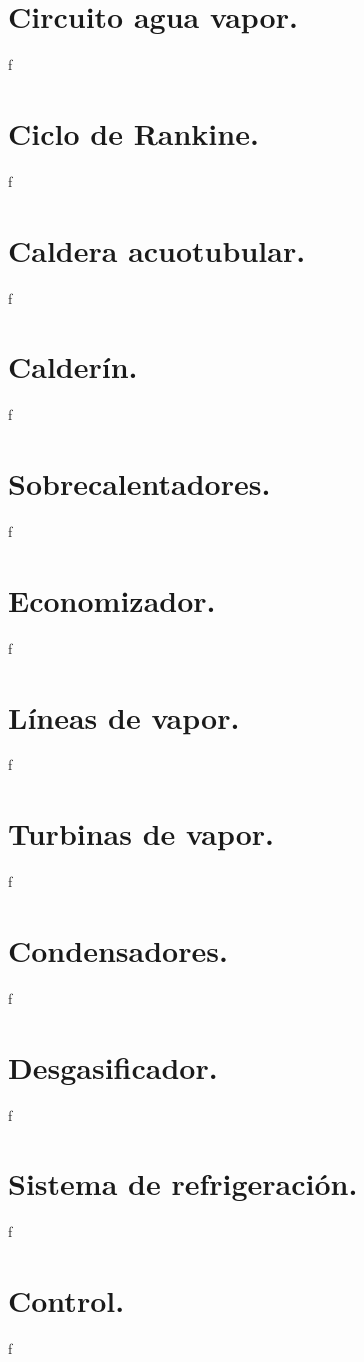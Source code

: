 \section{Circuito agua vapor.}
f
\section{Ciclo de Rankine.}
f
\section{Caldera acuotubular.}
f
\section{Calderín.}
f
\section{Sobrecalentadores.}
f
\section{Economizador.}
f
\section{Líneas de vapor.}
f
\section{Turbinas de vapor.}
f
\section{Condensadores.}
f
\section{Desgasificador.}
f
\section{Sistema de refrigeración.}
f
\section{Control.}
f